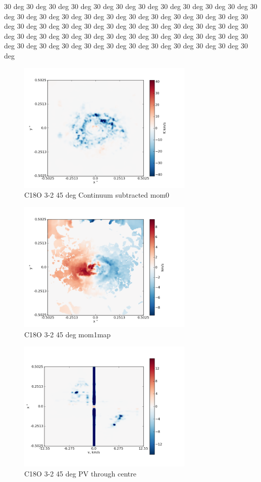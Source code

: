 \documentclass[useAMS,usenatbib]{mn2e}
\begin{document}
30 deg 30 deg 30 deg 30 deg 30 deg 30 deg 30 deg 30 deg 30 deg 30 deg 30 deg 30 deg 30 deg 30 deg 30 deg 30 deg 30 deg 30 deg 30 deg 30 deg 30 deg 30 deg 30 deg 30 deg 30 deg 30 deg 30 deg 30 deg 30 deg 30 deg 30 deg 30 deg 30 deg 30 deg 30 deg 30 deg 30 deg 30 deg 30 deg 30 deg 30 deg 30 deg 30 deg 30 deg 30 deg 30 deg 30 deg 30 deg 30 deg 30 deg 30 deg 30 deg 30 deg 30 deg 30 deg 30 deg 

\begin{figure}
 \includegraphics[width=84mm]{Figures/sim/imageC18O_3-2_45deg_contSub.png}

 \caption{C18O 3-2 45 deg Continuum subtracted mom0}
\end{figure}

\begin{figure}
 \includegraphics[width=84mm]{Figures/sim/imageC18O_3-2_45deg_mom1.png}

 \caption{C18O 3-2 45 deg mom1map}
\end{figure}

\begin{figure}
 \includegraphics[width=84mm]{Figures/sim/imageC18O_3-2_45deg_PV_centre.png}

 \caption{C18O 3-2 45 deg PV through centre}
\end{figure}
\end{document}

